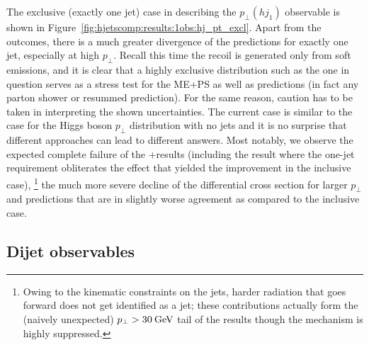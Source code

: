 The exclusive (exactly one jet) case in describing the $p_\perp(hj_1)$
observable is shown in Figure~\ref{fig:hjetscomp:results:1obs:hj_pt_excl}.
Apart from the \NNLOPS outcomes, there is a much greater divergence of
the predictions for exactly one jet, especially at high $p_\perp$.
Recall this time the recoil is generated only from soft emissions, and
it is clear that a highly exclusive distribution such as the one in
question serves as a stress test for the ME+PS as well as \NNLOPS
predictions (in fact any parton shower or resummed prediction). For
the same reason, caution has to be taken in interpreting the shown
uncertainties. The current case is similar to the case for the Higgs
boson $p_\perp$ distribution with no jets and it is no surprise that
different approaches can lead to different answers. Most notably, we
observe the expected complete failure of the \GoSam{}+\Sherpa results (including
the \Loopsim result where the one-jet requirement obliterates the
effect that yielded the improvement in the inclusive case),%
\footnote{Owing to the kinematic constraints on the jets, harder
  radiation that goes forward does not get identified as a jet;
  these contributions actually form the (naively unexpected)
  $p_\perp>30\text{\:GeV}$ tail of the \GoSam results though the mechanism is
  highly suppressed.}
the much more severe decline of the \Herwig differential cross section
for larger $p_\perp$ and \NNLOPS predictions that are in slightly worse 
agreement as compared to the inclusive case.



\subsection{Dijet observables}
\label{sec:hjetscomp:results:2jobs}

